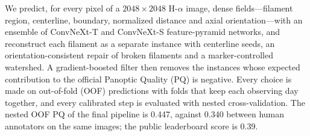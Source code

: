 We predict, for every pixel of a $2048\times2048$ H-$\alpha$ image, dense
fields---filament region, centerline, boundary, normalized distance and axial
orientation---with an ensemble of ConvNeXt-T and ConvNeXt-S feature-pyramid
networks, and reconstruct each filament as a separate instance with
centerline seeds, an orientation-consistent repair of broken filaments and a
marker-controlled watershed. A gradient-boosted filter then removes the
instances whose expected contribution to the official Panoptic Quality (PQ)
is negative. Every choice is made on out-of-fold (OOF) predictions with folds
that keep each observing day together, and every calibrated step is
evaluated with nested cross-validation. The nested OOF PQ of the final
pipeline is 0.447, against 0.340 between human annotators on the same
images; the public leaderboard score is 0.39.
